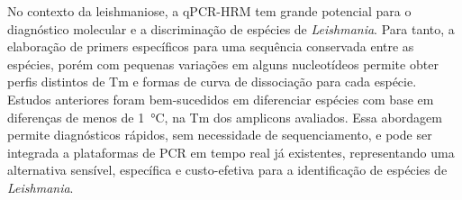 No contexto da leishmaniose, a qPCR-HRM tem grande potencial
para o diagnóstico molecular e a discriminação de espécies de
\textit{Leishmania}. Para tanto, a elaboração de primers específicos para uma
sequência conservada entre as espécies, porém com pequenas variações em alguns
nucleotídeos permite obter perfis distintos de Tm e
formas de curva de dissociação para cada espécie.
Estudos anteriores foram bem-sucedidos em diferenciar espécies com base em
diferenças de menos de \qty{1}{\celsius}, na Tm dos amplicons
avaliados\cite{Azam2024,HRMzampi2016,SaadiBenAoun2024}.
Essa abordagem permite diagnósticos rápidos, sem necessidade de sequenciamento,
e pode ser integrada a plataformas de PCR em tempo real já existentes,
representando uma alternativa sensível, específica e custo-efetiva para a
identificação de espécies de \textit{Leishmania}.
 

